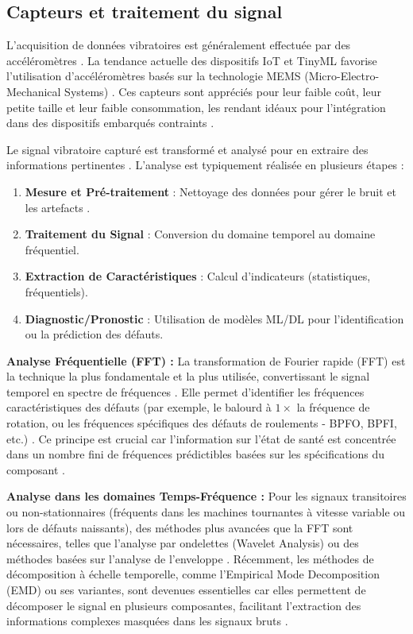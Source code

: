 \subsection{Capteurs et traitement du signal}

L'acquisition de données vibratoires est généralement effectuée par des accéléromètres \cite{hassan2024}. La tendance actuelle des dispositifs IoT et TinyML favorise l'utilisation d'accéléromètres basés sur la technologie MEMS (Micro-Electro-Mechanical Systems) \cite{hassan2024,arciniegas2025}. Ces capteurs sont appréciés pour leur faible coût, leur petite taille et leur faible consommation, les rendant idéaux pour l'intégration dans des dispositifs embarqués contraints \cite{hassan2024}.

Le signal vibratoire capturé est transformé et analysé pour en extraire des informations pertinentes \cite{hassan2024}. L'analyse est typiquement réalisée en plusieurs étapes \cite{tiboni2022}:
\begin{enumerate}
\item \textbf{Mesure et Pré-traitement} : Nettoyage des données pour gérer le bruit et les artefacts \cite{bagri2024}.
\item \textbf{Traitement du Signal} : Conversion du domaine temporel au domaine fréquentiel.
\item \textbf{Extraction de Caractéristiques} : Calcul d'indicateurs (statistiques, fréquentiels).
\item \textbf{Diagnostic/Pronostic} : Utilisation de modèles ML/DL pour l'identification ou la prédiction des défauts.
\end{enumerate}

\textbf{Analyse Fréquentielle (FFT) :} La transformation de Fourier rapide (FFT) est la technique la plus fondamentale et la plus utilisée, convertissant le signal temporel en spectre de fréquences \cite{cooley1965,hassan2024}. Elle permet d'identifier les fréquences caractéristiques des défauts (par exemple, le balourd à $1\times$ la fréquence de rotation, ou les fréquences spécifiques des défauts de roulements - BPFO, BPFI, etc.) \cite{matania2024,tiboni2022}. Ce principe est crucial car l'information sur l'état de santé est concentrée dans un nombre fini de fréquences prédictibles basées sur les spécifications du composant \cite{matania2024}.

\textbf{Analyse dans les domaines Temps-Fréquence :} Pour les signaux transitoires ou non-stationnaires (fréquents dans les machines tournantes à vitesse variable ou lors de défauts naissants), des méthodes plus avancées que la FFT sont nécessaires, telles que l'analyse par ondelettes (Wavelet Analysis) ou des méthodes basées sur l'analyse de l'enveloppe \cite{hassan2024}. Récemment, les méthodes de décomposition à échelle temporelle, comme l'Empirical Mode Decomposition (EMD) ou ses variantes, sont devenues essentielles car elles permettent de décomposer le signal en plusieurs composantes, facilitant l'extraction des informations complexes masquées dans les signaux bruts \cite{bagri2024}.

